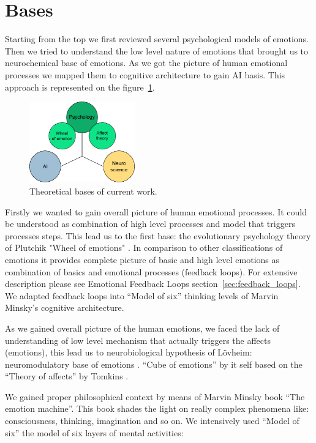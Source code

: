 \section{Bases}

Starting from the top we first reviewed several psychological models of emotions. Then we tried to understand the low level nature of emotions that brought us to neurochemical base of emotions. As we got the picture of human emotional processes we mapped them to cognitive architecture to gain AI basis. This approach is represented on the figure~\ref{3_bases}.

\begin{figure}
\begin{center}
 \includegraphics[height=3.5cm]{figure1_3_bases}
\end{center}
\caption{Theoretical bases of current work.}
\label{3_bases}
\end{figure}

Firstly we wanted to gain overall picture of human emotional processes. It could be understood as combination of high level processes and model that triggers processes steps. This lead us to the first base: the evolutionary psychology theory of Plutchik "Wheel of emotions" \cite{natureofemotions}. In comparison to other classifications of emotions it provides complete picture of basic and high level emotions as combination of basics and emotional processes (feedback loops). For extensive description please see Emotional Feedback Loops section~\ref{sec:feedback_loops}. We adapted feedback loops into ``Model of six'' \cite{emotionmachine} thinking levels of Marvin Minsky's cognitive architecture.

As we gained overall picture of the human emotions, we faced the lack of understanding of low level mechanism that actually triggers the affects (emotions), this lead us to neurobiological hypothesis of L\"{o}vheim: neuromodulatory base of emotions \cite{cubeofemotions}. ``Cube of emotions'' by it self based on the ``Theory of affects'' by Tomkins \cite{primer_affect_psychology, tomkins1, tomkins2, tomkins3}.

We gained proper philosophical context by means of Marvin Minsky book ``The emotion machine''. This book shades the light on really complex phenomena like: consciousness, thinking, imagination and so on. We intensively used ``Model of six'' the model of six layers of mental activities:

